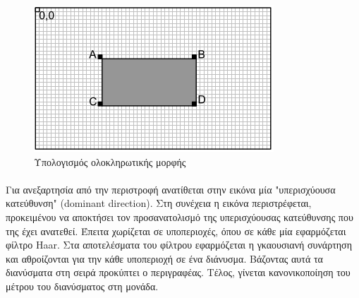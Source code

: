 \begin{figure}
        \centering
                \centerline{\includegraphics[scale = 1]{./images/integral.png}}
                \caption{Υπολογισμός ολοκληρωτικής μορφής}
                \label{fig:integral}
\end{figure}


\paragraph*{}
Για ανεξαρτησία από την περιστροφή ανατίθεται στην εικόνα μία "υπερισχύουσα κατεύθυνση" (dominant direction). Στη συνέχεια η εικόνα περιστρέφεται, προκειμένου να αποκτήσει τον προσανατολισμό της υπερισχύουσας κατεύθυνσης που της έχει ανατεθεί. Έπειτα χωρίζεται σε υποπεριοχές, όπου σε κάθε μία εφαρμόζεται φίλτρο Haar. Στα αποτελέσματα του φίλτρου εφαρμόζεται η γκαουσιανή συνάρτηση και αθροίζονται για την κάθε υποπεριοχή σε ένα διάνυσμα. Βάζοντας αυτά τα διανύσματα στη σειρά προκύπτει ο περιγραφέας. Τέλος, γίνεται κανονικοποίηση του μέτρου του διανύσματος στη μονάδα.


